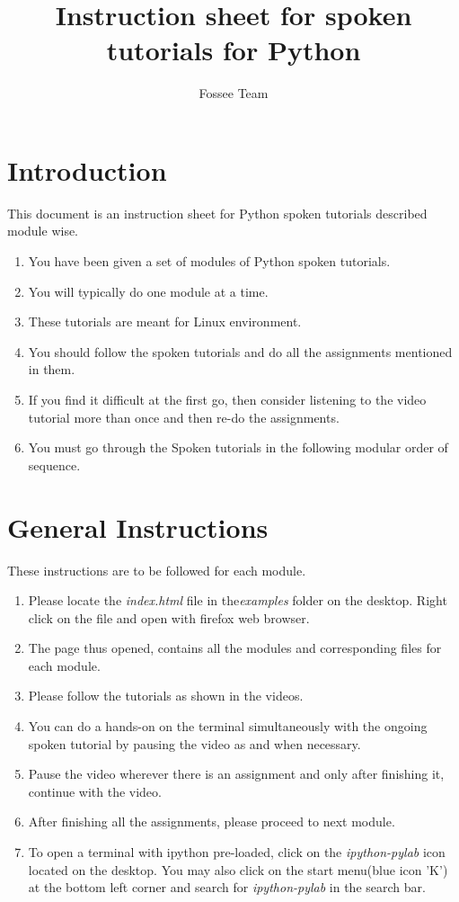 \documentclass[11pt,twocolumn]{article}
\begin{document}
\title{Instruction sheet for spoken tutorials for Python}
\author{Fossee Team}
\maketitle
\section*{Introduction }
{This document is an instruction sheet for Python spoken tutorials described module wise.}
\setlength{\columnsep}{15pt }
\begin{enumerate}
  \item You have been given a set of modules of Python spoken tutorials.
  \item You will typically do one module at a time.
  \item These tutorials are meant for Linux environment.
  \item You should follow the spoken tutorials and do all the assignments mentioned in them.
   \item If you find it difficult at the first go, then consider listening to the video tutorial more than once and then re-do the assignments.
   \item You must go through the Spoken tutorials in the following modular order of sequence. 
  

\end{enumerate}

\section*{General Instructions}
{These instructions are to be followed for each module.}
\setlength{\columnsep}{15pt }
\begin{enumerate}
	  
	
	\item Please locate the \emph{index.html} file in the\emph{examples} folder on the desktop. Right click on the file and open with firefox web browser.
     \item  The page thus opened, contains all the modules and corresponding files for each module.
  \item Please follow the tutorials as shown in the videos.
  \item You can do a hands-on on the terminal simultaneously with the ongoing spoken tutorial by pausing the video as and when necessary.
  \item Pause the video wherever there is an assignment and only after finishing it, continue with the video.
  \item After finishing all the assignments, please proceed to next module. 
\item To open a terminal with ipython pre-loaded, click on the \emph{ipython-pylab} icon located on the desktop. You may also click on the start menu(blue icon 'K') at the bottom left corner and search for \emph{ipython-pylab} in the search bar.


\end{enumerate}
\end{document}
